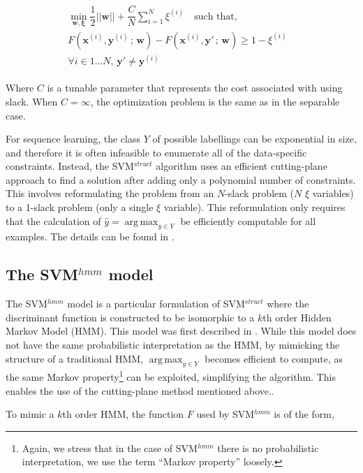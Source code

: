 \documentclass{article}
\DeclareMathOperator*{\argmax}{arg\,max}
\begin{document}
\begin{align*}
\begin{split}
\min_{\mathbf{w, \xi}}\dfrac{1}{2}||\mathbf{w}|| +
\dfrac{C}{N}\sum_{i=1}^{N}\xi^{(i)}
\quad\text{such that,}&\\
F(\mathbf{x}^{(i)}, \mathbf{y}^{(i)}\,;\,\mathbf{w}) -
F(\mathbf{x}^{(i)}, \mathbf{y}'\,;\,\mathbf{w}) \geq 1 - \xi^{(i)} \\
\forall i \in 1\dots N, \,\mathbf{y}' \neq \mathbf{y}^{(i)}
\end{split}
\end{align*}

Where $C$ is a tunable parameter that represents the cost associated with
using slack. When $C = \infty$, the optimization problem is the same as in
the separable case.

For sequence learning, the class $Y$ of possible labellings can be exponential
in size, and therefore it is often infeasible to enumerate all of the
data-specific constraints. Instead, the SVM$^{struct}$ algorithm uses an
efficient cutting-plane approach to find a solution after adding only a
polynomial number of constraints. This involves reformulating the problem from
an $N$-slack problem ($N$ $\xi$ variables) to a 1-slack problem (only a single
$\xi$ variable). This reformulation only requires that the calculation of
$\hat{y} = \argmax_{y \in Y}$ be efficiently computable for all examples. The
details can be found in \cite{joachims2009cutting}.

\subsection{The SVM$^{hmm}$ model}

The SVM$^{hmm}$ model is a particular formulation of SVM$^{struct}$ where the
discriminant function is constructed to be isomorphic to a $k$th order Hidden
Markov Model (HMM). This model was first described in \cite{altun2003hidden}.
While this model does not have the same probabilistic interpretation as the
HMM, by mimicking the structure of a traditional HMM, $\argmax_{y \in Y}$
becomes efficient to compute, as the same Markov property\footnote{Again, we
  stress that in the case of SVM$^{hmm}$ there is no probabilistic
interpretation, we use the term ``Markov property'' loosely.} can be exploited,
simplifying the algorithm. This enables the use of the cutting-plane method
mentioned above..

To mimic a $k$th order HMM, the function $F$ used by SVM$^{hmm}$ is of the
form,
\end{document}
